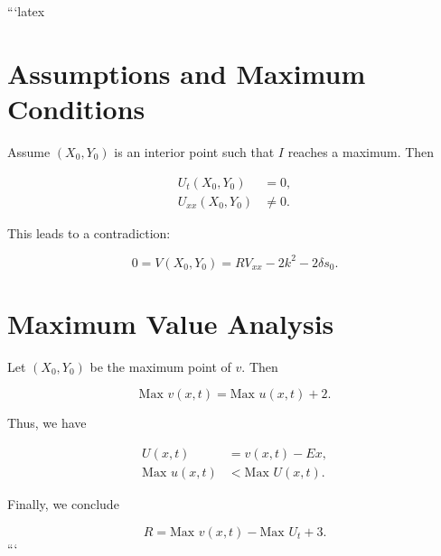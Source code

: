 ```latex
\section*{Assumptions and Maximum Conditions}

Assume $(X_0, Y_0)$ is an interior point such that $I$ reaches a maximum. Then

\begin{align}
    U_t(X_0, Y_0) &= 0, \\
    U_{xx}(X_0, Y_0) &\neq 0.
\end{align}

This leads to a contradiction:

\begin{equation}
    0 = V(X_0, Y_0) = R V_{xx} - 2k^2 - 2\delta s_0.
\end{equation}

\section*{Maximum Value Analysis}

Let $(X_0, Y_0)$ be the maximum point of $v$. Then

\begin{equation}
    \text{Max } v(x, t) = \text{Max } u(x, t) + 2.
\end{equation}

Thus, we have

\begin{align}
    U(x, t) &= v(x, t) - E x, \\
    \text{Max } u(x, t) &< \text{Max } U(x, t).
\end{align}

Finally, we conclude

\begin{equation}
    R = \text{Max } v(x, t) - \text{Max } U_t + 3.
\end{equation}
```
